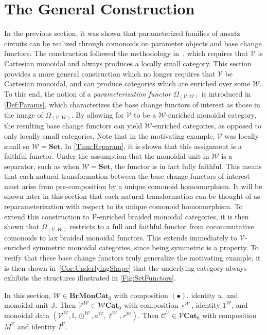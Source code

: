\section{The General Construction}
%
\label{Sect:Construction}

In the previous section, it was shown that parameterized families of ansatz circuits can be realized through comonoids on parameter objects and base change functors.
The construction followed the methodology in~\cite{Wesley2025}, which requires that $\mathcal{V}$ is Cartesian monoidal and always produces a locally small category.
This section provides a more general construction which no longer requires that $\mathcal{V}$ be Cartesian monoidal, and can produce categories which are enriched over some $\mathcal{W}$.
To this end, the notion of a \emph{parameterization functor} $\Omega_{(\mathcal{V},\mathcal{W})}$ is introduced in \cref{Def:Params}, which characterizes the base change functors of interest as those in the image of $\Omega_{(\mathcal{V},\mathcal{W})}$.
By allowing for $\mathcal{V}$ to be a $\mathcal{W}$-enriched monoidal category, the resulting base change functors can yield $\mathcal{W}$-enriched categories, as opposed to only locally small categories.
Note that in the motivating example, $\mathcal{V}$ was locally small so $\mathcal{W} = \mathbf{Set}$.
In \cref{Thm:Reparam}, it is shown that this assignment is a faithful functor.
Under the assumption that the monoidal unit in $\mathcal{W}$ is a separator, such as when $\mathcal{W} = \mathbf{Set}$, the functor is in fact fully faithful.
This means that each natural transformation between the base change functors of interest must arise from pre-composition by a unique comonoid homomorphism.
It will be shown later in this section that each natural transformation can be thought of as reparameterization with respect to its unique comonoid homomorphism.
To extend this construction to $\mathcal{V}$-enriched braided monoidal categories, it is then shown that $\Omega_{(\mathcal{V},\mathcal{W})}$ restricts to a full and faithful functor from cocommutative comonoids to lax braided monoidal functors.
This extends immediately to $\mathcal{V}$-enriched symmetric monoidal categories, since being symmetric is a property.
To verify that these base change functors truly generalize the motivating example, it is then shown in~\cref{Cor:UnderlyingShape} that the underlying category always exhibits the structures illustrated in \cref{Fig:SetFunctors}.

\begin{nota}
    In this section, $\mathcal{W} \in \mathbf{BrMonCat}_0$ with composition $( \bullet )$, identity $u$, and monoidal unit $\mathbb{J}$.
    Then $\mathcal{V}^{\mathcal{W}} \in \mathcal{W}\mathbf{Cat}_0$ with composition $\circ^{\mathcal{W}}$, identity $1^{\mathcal{W}}$, and monoidal data $( \mathcal{V}^{\mathcal{W}}, \mathbb{I}, \odot^{\mathcal{W}}, a^{\mathcal{W}}, \ell^{\mathcal{W}}, r^{\mathcal{W}} )$.
    Then $\mathcal{C}^{\mathcal{V}} \in \mathcal{V}\mathbf{Cat}_0$ with composition $M^{\mathcal{V}}$ and identity $I^{\mathcal{V}}$.
\end{nota}

